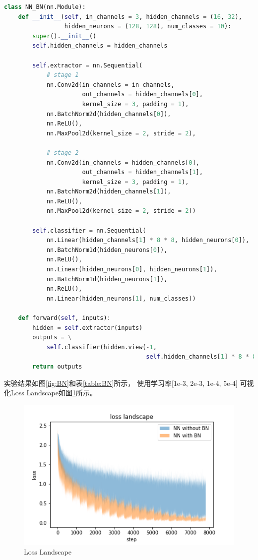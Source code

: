 \documentclass{article}
\begin{document}
\begin{lstlisting}[language=Python]
class NN_BN(nn.Module):
    def __init__(self, in_channels = 3, hidden_channels = (16, 32),
                 hidden_neurons = (128, 128), num_classes = 10):
        super().__init__()
        self.hidden_channels = hidden_channels

        self.extractor = nn.Sequential(
            # stage 1
            nn.Conv2d(in_channels = in_channels,
                      out_channels = hidden_channels[0],
                      kernel_size = 3, padding = 1),
            nn.BatchNorm2d(hidden_channels[0]),
            nn.ReLU(),
            nn.MaxPool2d(kernel_size = 2, stride = 2),

            # stage 2
            nn.Conv2d(in_channels = hidden_channels[0],
                      out_channels = hidden_channels[1],
                      kernel_size = 3, padding = 1),
            nn.BatchNorm2d(hidden_channels[1]),
            nn.ReLU(),
            nn.MaxPool2d(kernel_size = 2, stride = 2))

        self.classifier = nn.Sequential(
            nn.Linear(hidden_channels[1] * 8 * 8, hidden_neurons[0]),
            nn.BatchNorm1d(hidden_neurons[0]),
            nn.ReLU(),
            nn.Linear(hidden_neurons[0], hidden_neurons[1]),
            nn.BatchNorm1d(hidden_neurons[1]),
            nn.ReLU(),
            nn.Linear(hidden_neurons[1], num_classes))

    def forward(self, inputs):
        hidden = self.extractor(inputs)
        outputs = \
            self.classifier(hidden.view(-1,
                                        self.hidden_channels[1] * 8 * 8))
        return outputs
\end{lstlisting}

实验结果如图\ref{fig:BN}和表\ref{table:BN}所示，
使用学习率[1e-3, 2e-3, 1e-4, 5e-4]
可视化Loss Landscape如图\ref{fig:NNLL}所示。

\begin{figure}[h]
\includegraphics[width=\textwidth]
{Result/NN BN 0.0005/figure.png}
\caption{Loss Landscape}
\label{fig:NNLL}
\end{figure}
\end{document}
